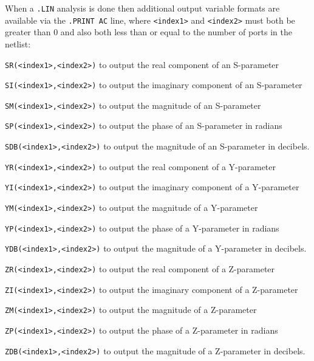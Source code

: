 When a \texttt{.LIN} analysis is done then additional output variable formats are available
via the \texttt{.PRINT AC} line, where \texttt{<index1>} and \texttt{<index2>} must both
be greater than 0 and also both less than or equal to the number of ports in the netlist:
\begin{XyceItemize}
\item \texttt{SR(<index1>,<index2>)} to output the real component of an S-parameter
\item \texttt{SI(<index1>,<index2>)} to output the imaginary component of an S-parameter
\item \texttt{SM(<index1>,<index2>)} to output the magnitude of an S-parameter
\item \texttt{SP(<index1>,<index2>)} to output the phase of an S-parameter in radians
\item \texttt{SDB(<index1>,<index2>)} to output the magnitude of an S-parameter in decibels.
\item \texttt{YR(<index1>,<index2>)} to output the real component of a Y-parameter
\item \texttt{YI(<index1>,<index2>)} to output the imaginary component of a Y-parameter
\item \texttt{YM(<index1>,<index2>)} to output the magnitude of a Y-parameter
\item \texttt{YP(<index1>,<index2>)} to output the phase of a Y-parameter in radians
\item \texttt{YDB(<index1>,<index2>)} to output the magnitude of a Y-parameter in decibels.
\item \texttt{ZR(<index1>,<index2>)} to output the real component of a Z-parameter
\item \texttt{ZI(<index1>,<index2>)} to output the imaginary component of a Z-parameter
\item \texttt{ZM(<index1>,<index2>)} to output the magnitude of a Z-parameter
\item \texttt{ZP(<index1>,<index2>)} to output the phase of a Z-parameter in radians
\item \texttt{ZDB(<index1>,<index2>)} to output the magnitude of a Z-parameter in decibels.
\end{XyceItemize}


